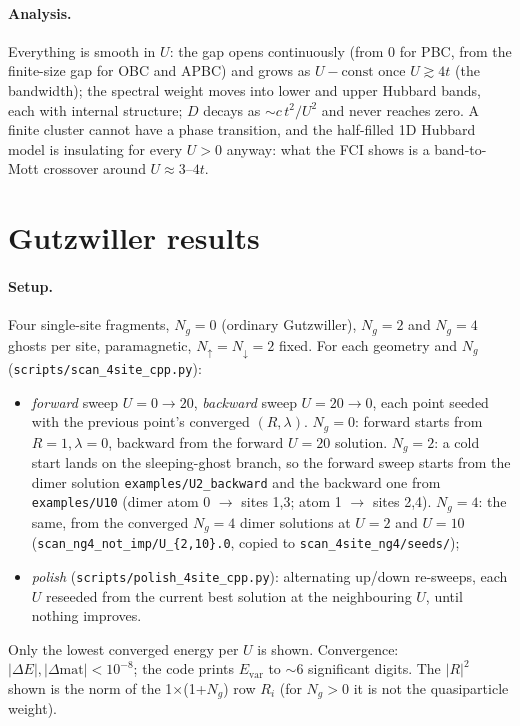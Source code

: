 \documentclass[11pt]{article}
\newcommand{\Ng}{N_{g}}
\newcommand{\Evar}{E_{\mathrm{var}}}
\begin{document}
\paragraph{Analysis.}
Everything is smooth in $U$: the gap opens continuously (from $0$ for PBC, from the finite-size gap
for OBC and APBC) and grows as $U-\mathrm{const}$ once $U\gtrsim4t$ (the bandwidth); the spectral weight moves
into lower and upper Hubbard bands, each with internal structure; $D$ decays as $\sim c\,t^2/U^2$ and never
reaches zero. A finite cluster cannot have a phase transition, and the half-filled 1D Hubbard model
is insulating for every $U>0$ anyway: what the FCI shows is a band-to-Mott crossover around $U\approx3$--$4t$.

\section{Gutzwiller results}
\label{sec:gutz}

\paragraph{Setup.} Four single-site fragments, $\Ng=0$ (ordinary Gutzwiller), $\Ng=2$ and $\Ng=4$ ghosts per site,
paramagnetic, $N_\uparrow=N_\downarrow=2$ fixed. For each geometry and $\Ng$
(\texttt{scripts/scan\_4site\_cpp.py}):
\begin{itemize}[nosep]
  \item \emph{forward} sweep $U=0\to20$, \emph{backward} sweep $U=20\to0$, each point seeded with the previous point's
        converged $(R,\lambda)$. $\Ng=0$: forward starts from $R=1,\lambda=0$, backward from the forward $U=20$ solution.
        $\Ng=2$: a cold start lands on the sleeping-ghost branch, so the forward sweep starts from the dimer solution
        \texttt{examples/U2\_backward} and the backward one from \texttt{examples/U10} (dimer atom 0 $\to$ sites 1,3;
        atom 1 $\to$ sites 2,4). $\Ng=4$: the same, from the converged $\Ng=4$ dimer solutions at $U=2$ and $U=10$
        (\texttt{scan\_ng4\_not\_imp/U\_\{2,10\}.0}, copied to \texttt{scan\_4site\_ng4/seeds/});
  \item \emph{polish} (\texttt{scripts/polish\_4site\_cpp.py}): alternating up/down re-sweeps, each $U$ reseeded from the
        current best solution at the neighbouring $U$, until nothing improves.
\end{itemize}
Only the lowest converged energy per $U$ is shown. Convergence: $|\Delta E|,|\Delta\mathrm{mat}|<10^{-8}$; the code prints
$\Evar$ to $\sim6$ significant digits. The $|R|^2$ shown is the norm of the 1$\times$(1+$\Ng$) row $R_i$ (for $\Ng>0$ it is not the
quasiparticle weight).
\end{document}
